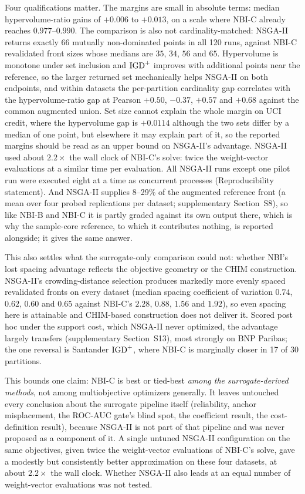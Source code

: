 Four qualifications matter. The margins are small in absolute terms: median hypervolume-ratio gains of $+0.006$ to
$+0.013$, on a scale where NBI-C already reaches $0.977$--$0.990$. The comparison is also not
cardinality-matched: NSGA-II returns exactly 66 mutually non-dominated points in all 120 runs, against NBI-C
revalidated front sizes whose medians are $35$, $34$, $56$ and $65$. Hypervolume is monotone under set inclusion and
$\mathrm{IGD}^{+}$ improves with additional points near the reference, so the larger returned set mechanically helps NSGA-II on
both endpoints, and within datasets the per-partition cardinality gap correlates with the hypervolume-ratio gap at
Pearson $+0.50$, $-0.37$, $+0.57$ and $+0.68$ against the common augmented union. Set size cannot explain the whole
margin on UCI credit, where the hypervolume gap is $+0.0114$ although the two sets differ by a median of one point,
but elsewhere it may explain part of it, so the reported margins should be read as an upper bound on NSGA-II's
advantage. NSGA-II used about $2.2\times$ the wall clock of NBI-C's solve: twice the weight-vector evaluations at a
similar time per evaluation. All NSGA-II runs except one pilot run were executed eight at a time as concurrent
processes (Reproducibility statement). And NSGA-II supplies 8--29\% of the augmented reference front (a mean over four probed
replications per dataset; supplementary Section~S8), so like NBI-B
and NBI-C it is partly graded against its own output there, which is why the sample-core reference, to which it
contributes nothing, is reported alongside; it gives the same answer.

This also settles what the surrogate-only comparison could not: whether NBI's lost spacing advantage reflects the
objective geometry or the CHIM construction. NSGA-II's crowding-distance selection produces markedly more evenly
spaced revalidated fronts on every dataset (median spacing coefficient of variation $0.74$, $0.62$, $0.60$ and
$0.65$ against NBI-C's $2.28$, $0.88$, $1.56$ and $1.92$), so even spacing here is attainable and CHIM-based
construction does not deliver it. Scored post hoc under the support cost, which NSGA-II never optimized, the advantage
largely transfers (supplementary Section~S13), most strongly on BNP Paribas; the one reversal is Santander $\mathrm{IGD}^{+}$, where
NBI-C is marginally closer in 17 of 30 partitions.

This bounds one claim: NBI-C is best or tied-best \emph{among the surrogate-derived methods}, not among
multiobjective optimizers generally. It leaves untouched every conclusion about the surrogate pipeline itself
(reliability, anchor misplacement, the ROC-AUC gate's blind spot, the coefficient result, the cost-definition result),
because NSGA-II is not part of that pipeline and was never proposed as a component of it. A single untuned NSGA-II
configuration on the same objectives, given twice the weight-vector evaluations of NBI-C's solve, gave a modestly but
consistently better approximation on these four datasets, at about $2.2\times$ the wall clock. Whether NSGA-II also
leads at an equal number of weight-vector evaluations was not tested.

